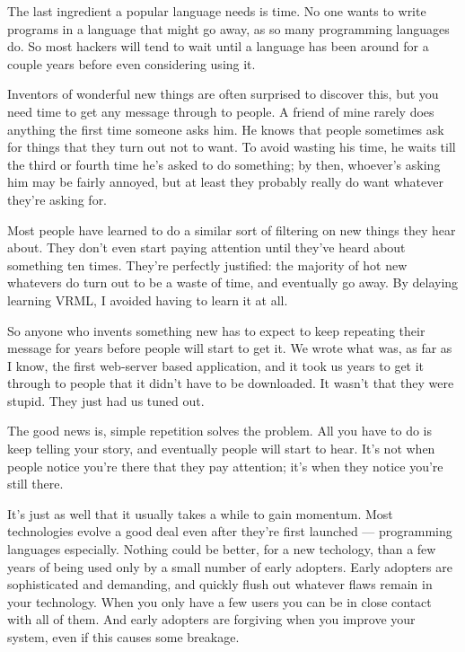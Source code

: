 The last ingredient a popular language needs is
                  time. No one wants to write programs in a language that might
                  go away, as so many programming languages do. So most hackers
                  will tend to wait until a language has been around for a
                  couple years before even considering using it.

Inventors
                  of wonderful new things are often surprised to discover this,
                  but you need time to get any message through to people. A
                  friend of mine rarely does anything the first time someone
                  asks him. He knows that people sometimes ask for things that
                  they turn out not to want. To avoid wasting his time, he waits
                  till the third or fourth time he's asked to do something; by
                  then, whoever's asking him may be fairly annoyed, but at least
                  they probably really do want whatever they're asking for.

Most
                  people have learned to do a similar sort of filtering on new
                  things they hear about. They don't even start paying attention
                  until they've heard about something ten times. They're
                  perfectly justified: the majority of hot new whatevers do turn
                  out to be a waste of time, and eventually go away. By delaying
                  learning VRML, I avoided having to learn it at all.

So
                  anyone who invents something new has to expect to keep
                  repeating their message for years before people will start to
                  get it. We wrote what was, as far as I know, the first
                  web-server based application, and it took us years to get it
                  through to people that it didn't have to be downloaded. It
                  wasn't that they were stupid. They just had us tuned out.

The
                  good news is, simple repetition solves the problem. All you
                  have to do is keep telling your story, and eventually people
                  will start to hear. It's not when people notice you're there
                  that they pay attention; it's when they notice you're still
                  there.

It's just as well that it usually takes a
                  while to gain momentum. Most technologies evolve a good deal
                  even after they're first launched --- programming
                  languages especially. Nothing could be better, for a new
                  techology, than a few years of being used only by a small
                  number of early adopters. Early adopters are sophisticated and
                  demanding, and quickly flush out whatever flaws remain in your
                  technology. When you only have a few users you can be in close
                  contact with all of them. And early adopters are forgiving
                  when you improve your system, even if this causes some
                  breakage.


